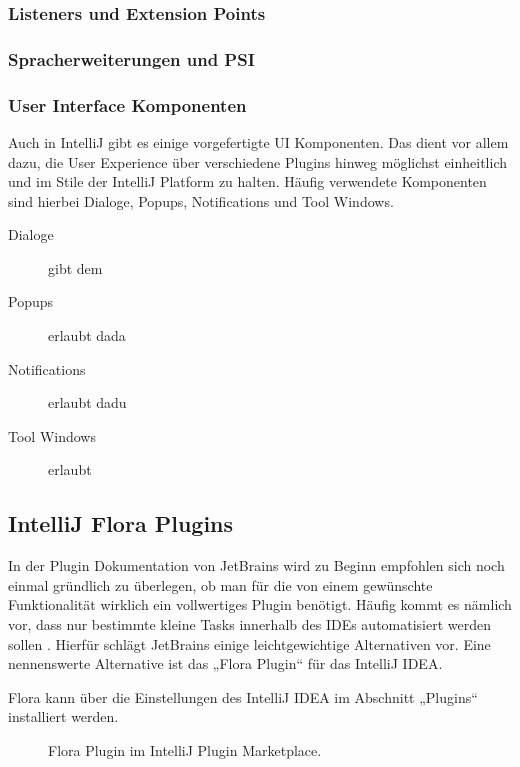 \subsubsection{Listeners und Extension Points} %

\subsubsection{Spracherweiterungen und PSI}


\subsubsection{User Interface Komponenten}
  Auch in IntelliJ gibt es einige vorgefertigte UI Komponenten. Das dient vor allem dazu, die
  User Experience über verschiedene Plugins hinweg möglichst einheitlich und im Stile
  der IntelliJ Platform zu halten. Häufig verwendete Komponenten sind hierbei Dialoge, Popups,
  Notifications und Tool Windows.
  \begin{description}
    \item[Dialoge] gibt dem 
    \item[Popups] erlaubt dada
    \item[Notifications] erlaubt dadu
    \item[Tool Windows] erlaubt
  \end{description}

\subsection{IntelliJ Flora Plugins}

In der Plugin Dokumentation von JetBrains wird zu Beginn 
empfohlen sich noch einmal gründlich zu überlegen, ob man 
für die von einem gewünschte Funktionalität wirklich ein 
vollwertiges Plugin benötigt. Häufig kommt es nämlich vor, 
dass nur bestimmte kleine Tasks innerhalb des IDEs 
automatisiert werden sollen \cite{IntelliJSDKDocumentation}. Hierfür schlägt JetBrains 
einige leichtgewichtige Alternativen vor. Eine nennenswerte 
Alternative ist das „Flora Plugin“ für das IntelliJ IDEA. 

Flora kann über die Einstellungen des IntelliJ IDEA 
im Abschnitt „Plugins“ installiert werden.

\begin{figure}
    \centering
    \caption{Flora Plugin im IntelliJ Plugin Marketplace.}
    \label{fig:FloraPlugin}
\end{figure}    
 
